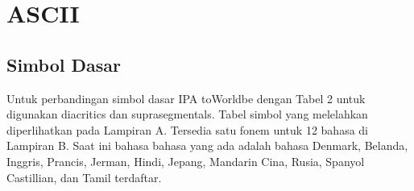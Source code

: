 \section{ASCII}
\subsection{Simbol Dasar}
Untuk perbandingan simbol dasar IPA toWorldbe dengan  Tabel 2 untuk digunakan diacritics dan suprasegmentals. Tabel simbol yang melelahkan diperlihatkan pada Lampiran A. Tersedia satu fonem untuk 12 bahasa di Lampiran B. Saat ini bahasa bahasa yang ada adalah bahasa Denmark, Belanda, Inggris, Prancis, Jerman, Hindi, Jepang, Mandarin Cina, Rusia, Spanyol Castillian, dan Tamil terdaftar.